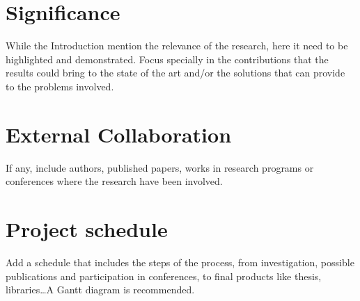 \documentclass[
  11pt,
  a4paper,
  oneside
]{article}
\begin{document}
\section{Significance}
While the Introduction mention the relevance of the research, here it need to be highlighted and demonstrated. Focus specially in the contributions that the results could bring to the state of the art and/or the solutions that can provide to the problems involved.

\section{External Collaboration}

If any, include authors, published papers, works in research programs or conferences where the research have been involved.

\section{Project schedule}
Add a schedule that includes the steps of the process, from investigation, possible publications and participation in conferences, to final products like thesis, libraries\ldots A Gantt diagram is recommended.



\end{document}
